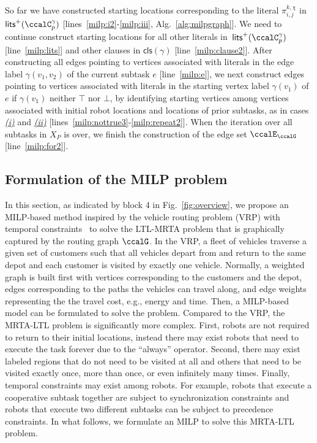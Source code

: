 \documentclass[Afour,sageh,times]{sagej}
\newcommand{\clause}[1]{\mathsf{cls}(#1)}
\renewcommand{\ap}[3]{\mathcal{\pi}_{{#1},{#2}}^{#3}}
\begin{document}
So far we have constructed starting locations corresponding to the literal $\ap{i}{j}{k,\chi}$ in $\mathsf{lits}^+(\ccalC_p^{\gamma})$ [lines~\ref{milp:i2}-\ref{milp:iii}, Alg.~\ref{alg:milpgraph}]. We need to continue construct starting locations for all other literals in~$\mathsf{lits}^+(\ccalC_p^{\gamma})$ [line~\ref{milp:lits}] and other clauses in $\clause{\gamma}$ [line~\ref{milp:clause2}].
After constructing all edges pointing to vertices associated with literals in the edge label $\gamma(v_1, v_2)$ of the current subtask $e$ [line~\ref{milp:e}], we next construct  edges pointing to vertices associated with literals in the starting vertex label $\gamma(v_1)$ of $e$ if $\gamma(v_1)$ neither $\top$ nor $\bot$, by identifying starting vertices among vertices associated with initial robot locations and locations of prior subtasks, as in cases \hyperref[sec:a]{\it (i)} and \hyperref[sec:b]{\it (ii)} [lines~\ref{milp:nottrue3}-\ref{milp:repeat2}]. When the iteration over all subtasks in $X_{P}$ is over, we finish the construction of  the edge set $\ccalE_\ccalG$ [line~\ref{milp:for2}].

 \subsection{Formulation of the MILP problem}\label{sec:milp}
 In this section, as indicated by block 4 in Fig.~\ref{fig:overview}, we propose an MILP-based method inspired by the vehicle routing problem (VRP) with temporal constraints~\cite{bredstrom2008combined} to solve the LTL-MRTA problem that is graphically captured by the routing graph $\ccalG$. In the VRP, a fleet of vehicles traverse a given set of customers such that all vehicles depart from and return to the same depot and each customer is visited by exactly one vehicle. Normally, a weighted graph is built first with vertices corresponding to the customers and the depot, edges corresponding to the paths the vehicles can travel along, and edge weights representing the the travel cost, e.g., energy and time. Then,  a MILP-based model can be formulated to solve the problem. Compared to the VRP, the MRTA-LTL problem is significantly more complex. First, robots are not required  to return to their initial locations, instead there may exist robots that need to execute the task forever due to the  ``always'' operator. Second, there may exist  labeled regions that do not need to be  visited at all and others that need to be visited exactly once,  more than once, or even infinitely  many times. Finally, temporal constraints may exist  among robots. For example, robots that execute a cooperative subtask together are subject to synchronization constraints and robots that execute two different subtasks can be subject to precedence constraints. In what follows, we formulate an MILP to solve this MRTA-LTL problem.
\end{document}
